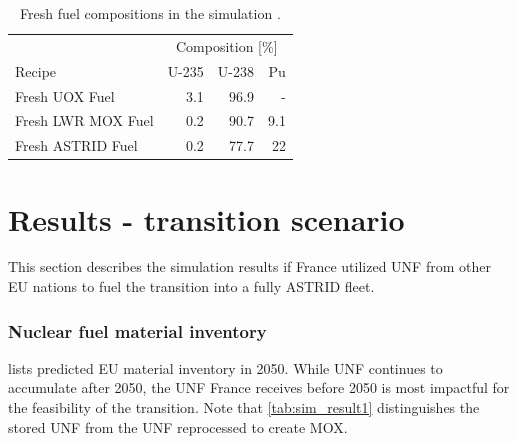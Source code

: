 \begin{table}[h]
    \centering
    \caption{Fresh fuel compositions in the simulation \cite{wilson_adoption_2009, varaine_pre-conceptual_2012}.}
        \begin{tabular}{lrrr}
            \hline
             & \multicolumn{3}{c}{ Composition [\%]} \\
            Recipe & U-235  & U-238  & Pu \\ 
            \hline
            Fresh \gls{UOX} Fuel & 3.1 & 96.9 & -   \\ 
            Fresh \gls{LWR} \gls{MOX} Fuel & 0.2 & 90.7 & 9.1 \\ 
            Fresh \gls{ASTRID} Fuel & 0.2 & 77.7 & 22 \\
            \hline
        \end{tabular}
        
        \label{tab:sim_result}
\end {table}




\section{Results - transition scenario}
This section describes the simulation results if France utilized
\gls{UNF} from other \gls{EU} nations to fuel the transition into a fully
\gls{ASTRID} fleet.

\subsubsection{Nuclear fuel material inventory}
lists predicted \gls{EU} material inventory in 2050.
While \gls{UNF} continues to accumulate after 2050, the
\gls{UNF} France receives before 2050 is most impactful for the
feasibility of the transition. Note that \cref{tab:sim_result1} 
distinguishes the
stored \gls{UNF} from the \gls{UNF} reprocessed to create \gls{MOX}.

